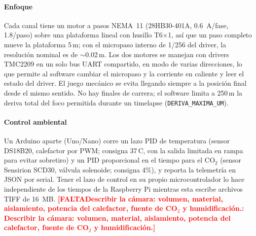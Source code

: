\documentclass[preprint,12pt]{elsarticle}
\DeclareRobustCommand{\TODO}[1]{\textcolor{red}{\textbf{[FALTA\ifx\relax#1\relax\else: #1\fi]}}}
\newcommand{\um}{\,\textmu m}
\begin{document}
\paragraph{Enfoque} Cada canal tiene un motor a pasos NEMA~11
(28HB30-401A, 0.6~A/fase, 1.8\textdegree/paso) sobre una plataforma lineal
con husillo T6$\times$1, así que un paso completo mueve la plataforma
5\um; con el micropaso interno de 1/256 del driver, la resolución nominal
es de $\sim$0.02\um. Los dos motores se manejan con drivers TMC2209 en un
solo bus UART compartido, en modo de varias direcciones, lo que permite al
software cambiar el micropaso y la corriente en caliente y leer el estado
del driver. El juego mecánico se evita llegando siempre a la posición final
desde el mismo sentido. No hay finales de carrera; el software limita a
250\um{} la deriva total del foco permitida durante un timelapse
(\texttt{DERIVA\_MAXIMA\_UM}).

\paragraph{Control ambiental} Un Arduino aparte (Uno/Nano) corre un lazo
PID de temperatura (sensor DS18B20, calefactor por PWM; consigna
37\,\textdegree C, con la salida limitada en rampa para evitar
sobretiro) y un PID proporcional en el tiempo para el CO$_2$ (sensor
Sensirion SCD30, válvula solenoide; consigna 4\%), y reporta la
telemetría en JSON por serial. Tener el lazo de control en su propio
microcontrolador lo hace independiente de los tiempos de la Raspberry Pi
mientras esta escribe archivos TIFF de 16~MB. \TODO{Describir la cámara:
volumen, material, aislamiento, potencia del calefactor, fuente de CO$_2$
y humidificación.}
\end{document}
